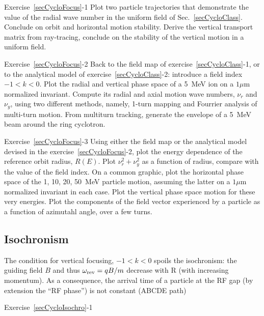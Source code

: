 \smallskip
\noindent {\small $\bullet$} Exercise~\ref{secCycloFocus}-1
Plot two particle trajectories that demonstrate the value of the radial wave number in the uniform 
field of Sec.~\ref{secCycloClass}. Conclude on orbit and horizontal motion  stability. 
Derive the  vertical  transport matrix from ray-tracing, conclude on the stability of the vertical motion
in a uniform field.


\smallskip
\noindent {\small $\bullet$} Exercise~\ref{secCycloFocus}-2
Back to the field map of exercise~\ref{secCycloClass}-1, or to the analytical model 
of exercise~\ref{secCycloClass}-2: introduce a field index $-1<k<0$. 
Plot the radial and vertical phase space of a 5~MeV ion on a $1\mu$m normalized invariant.  
Compute its radial and axial motion wave numbers, $\nu_r$ and $\nu_y$, 
using two different methods, namely, 1-turn mapping and  Fourrier analysis of multi-turn motion. 
From multiturn tracking, generate the envelope of a 5~MeV beam around the ring cyclotron.  


\smallskip
\noindent {\small $\bullet$} Exercise~\ref{secCycloFocus}-3
Using either the field map or the analytical model devised in the  exercise~\ref{secCycloFocus}-2, 
 plot the energy dependence of the reference orbit radius, $R(E)$. 
Plot  $\nu_r^2 + \nu_y^2$ as a function of radius, compare with the value of the field index. 
On a common graphic, plot the horizontal phase space of the 1, 10, 20, 50~MeV particle motion,
assuming the latter on a $1\mu$m normalized invariant in each case.
Plot the vertical phase space motion for these very energies. 
Plot the components of the field vector experienced by a particle as a function of 
azimutahl angle, over a few turns.


\subsection{Isochronism  \label{secCycloIsochro}}
  

The  condition  for vertical focusing, $-1 < k <0$ 
spoils the isochronism: the guiding field $B$ and thus $\omega_{\rm rev} = qB/m$ decrease with R (with increasing momentum). 
 As a consequence, the arrival time of a particle at the RF gap (by 
extension the ``RF phase'') is not constant  (ABCDE path)


\smallskip
\noindent {\small $\bullet$} Exercise~\ref{secCycloIsochro}-1


